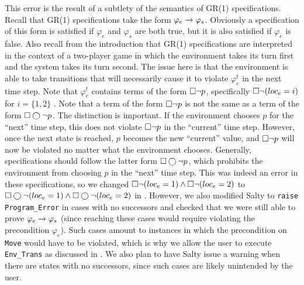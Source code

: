 \documentclass[runningheads]{llncs}
\begin{document}
This error is the result of a subtlety of the semantics of GR(1) specifications. 
Recall that GR(1) specifications take the form $\varphi_e \rightarrow \varphi_s$. 
Obviously a specification of this form is satisfied if $\varphi_e$ and $\varphi_s$ are both true, 
but it is also satisfied if $\varphi_e$ is false. 
Also recall from the introduction that GR(1) specifications are interpreted in the context of a two-player game 
in which the environment takes its turn first and the system takes its turn second. 
The issue here is that the environment is able to take transitions that will necessarily cause it to violate $\varphi_e^t$ in the next time step. 
Note that $\varphi_e^t$ contains terms of the form $\square \lnot p$, specifically $\square \lnot (loc_e = i)$ for $i = \{1, 2\}$  . 
Note that a term of the form $\square \lnot p$ is not the same as a term of the form $\square \varbigcirc \lnot p$. 
The distinction is important. 
If the environment chooses $p$ for the ``next'' time step, this does not violate $\square \lnot p$ in the ``current'' time step. %
However, once the next state is reached, $p$ becomes the new ``current'' value, and $\square \lnot p$ 
will now be violated no matter what the environment chooses.
Generally, specifications should follow the latter form $\square \varbigcirc \lnot p$, 
which prohibits the environment from choosing $p$ in the ``next'' time step. 
This was indeed an error in these specifications, so we changed $\square \lnot (loc_e = 1) \land \square \lnot (loc_e = 2)$
 to $\square \varbigcirc \lnot (loc_e = 1) \land \square \varbigcirc \lnot (loc_e = 2)$ in .
However, we also modified Salty to \lstinline{raise Program_Error} in cases with no successors 
and checked that we were still able to prove $\varphi_e \rightarrow \varphi_s$ 
(since reaching these cases would require violating the precondition $\varphi_e$). 
Such cases amount to instances in which the precondition on \lstinline{Move} would have to be violated, 
which is why we allow the user to execute \lstinline{Env_Trans} 
as discussed in . 
We also plan to have Salty issue a warning when there are states with no successors, 
since such cases are likely unintended by the user.


\end{document}
